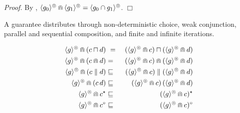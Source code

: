 \documentclass[fleqn]{fac}
\renewenvironment{proof}{\noindent \textit{Proof.}}{\noindent$\Box$\par}
\newcommand{\labelproperty}[1]{\label{property-#1}\index{Property!#1|PropertyDef{\ref{property-#1}}}}
\newcommand{\SSeq}{\,}
\newcommand{\atomicrel}[1]{\langle#1\rangle}
\newcommand{\omegaskip}{\circledcirc}
\newcommand{\InfSkipIter}{^{\omegaskip}}
\newcommand{\InfGuar}[1]{\atomicrel{#1}\InfSkipIter}
\newcommand{\relint}{\cap}
\newcommand{\nondet}{\mathbin{\sqcap}}
\newcommand{\strictconjunction}{weak conjunction}
\newcommand{\together}{\mathbin{\doublecap}}
\newcommand{\FinIter}{^{\star}}
\newcommand{\FinOrInfIter}{^{\circ}}
\begin{document}
\begin{proof}
By , 
$\InfGuar{g_0} \together \InfGuar{g_1} = \InfGuar{g_0 \relint g_1}$.
\end{proof}




A guarantee distributes through 
non-deterministic choice, \strictconjunction, parallel and sequential composition,
and finite and infinite iterations.
\begin{lawx}
\begin{eqnarray}
  \InfGuar{g} \together (c \nondet d) & ~=~ & (\InfGuar{g} \together c) \nondet (\InfGuar{g} \together d) 
  \labelproperty{guarantee-distribute-nondet} \\
  \InfGuar{g} \together (c \together d) & = & (\InfGuar{g} \together c) \together (\InfGuar{g} \together d) 
  \labelproperty{guarantee-distribute-conjunction} \\
  \InfGuar{g} \together (c \parallel d) & \refsto & (\InfGuar{g} \together c) \parallel (\InfGuar{g} \together d) 
  \labelproperty{guarantee-distribute-parallel} \\
  \InfGuar{g} \together (c \SSeq d) & \refsto & (\InfGuar{g} \together c) \SSeq (\InfGuar{g} \together d) 
  \labelproperty{guarantee-distribute-sequential} \\
  \InfGuar{g} \together c\FinIter & \refsto & (\InfGuar{g} \together c)\FinIter
  \labelproperty{guarantee-distribute-kleene} \\
  \InfGuar{g} \together c\FinOrInfIter & \refsto & (\InfGuar{g} \together c)\FinOrInfIter
  \labelproperty{guarantee-distribute-omega} 
\end{eqnarray}
\end{lawx}
\end{document}
